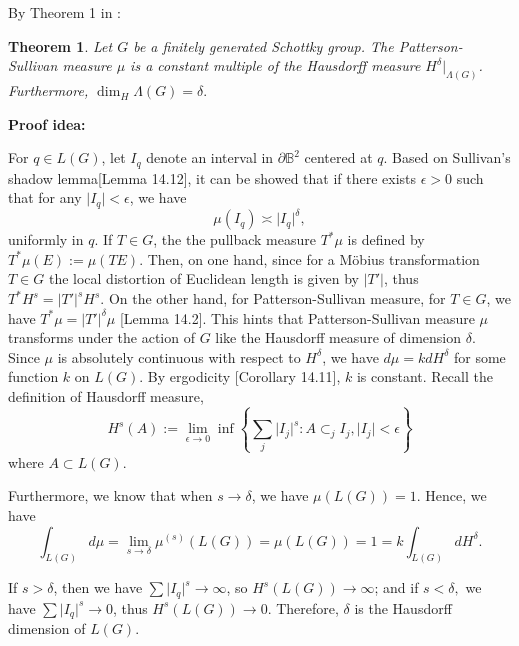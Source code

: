 \documentclass[12pt,oneside]{sfsuthesis}
\theoremstyle{plain} %
\newtheorem{theorem}{Theorem}[chapter]
\theoremstyle{definition}  %
\theoremstyle{remark}  %
\theoremstyle{plain}
\begin{document}
{By Theorem 1 in \cite{sullivan1984entropy}:
\begin{theorem}\label{Theorem14.14inBorthwick}%
Let $G$ be a finitely generated Schottky group. The Patterson-Sullivan measure $\mu$ is a constant multiple of the Hausdorff measure $H^{\delta}\vert_{\Lambda(G)}$. Furthermore, $\dim_H\Lambda(G)=\delta.$
\end{theorem}

\noindent\textbf{Proof idea:}

For $q\in L(G)$, let $I_q$ denote an interval in $\partial \mathbb{B}^2$ centered at $q$. Based on Sullivan's shadow lemma\cite{borthwick2007spectral}[Lemma 14.12], it can be showed that if there exists $\epsilon>0$ such that for any $\vert I_q\vert<\epsilon$, we have 
$$
\mu\left(I_q\right)\asymp \vert I_q\vert^\delta,
$$
uniformly in $q$. If $T\in G$, the the pullback measure $T^\ast \mu$ is defined by $T^\ast \mu(E):=\mu(TE)$. Then, on one hand, since for a M\"{o}bius transformation $T\in G$ the local distortion of Euclidean length is given by $\vert T'\vert$, thus $T^\ast H^s=\vert T' \vert^s H^s$. On the other hand, for Patterson-Sullivan measure, for $T\in G$, we have $T^\ast \mu=\vert T' \vert^\delta \mu$ \cite{borthwick2007spectral}[Lemma 14.2]. This hints that Patterson-Sullivan measure $\mu$ transforms under the action of $G$ like the Hausdorff measure of dimension $\delta$. Since $\mu$ is absolutely continuous with respect to $H^\delta$, we have $d\mu=kdH^\delta$ for some function $k$ on $L(G)$. By ergodicity \cite{borthwick2007spectral}[Corollary 14.11], $k$ is constant.
Recall the definition of Hausdorff measure,
$$
H^s\left(A\right):=\lim\limits_{\epsilon\to 0}\inf\left\lbrace \sum\limits_{j}\vert I_j\vert^s: A\subset_j I_j,\vert I_j\vert<\epsilon \right\rbrace
$$
where $A\subset L(G).$

Furthermore, we know that when $s\to \delta$, we have $\mu(L(G))=1$. Hence, we have
$$
\int_{L(G)} d\mu =\lim\limits_{s\to\delta}\mu^{(s)}(L(G)) = \mu(L(G))=1 = k \int_{L(G)} dH^\delta.
$$


If $s>\delta$, then we have $\sum\vert I_q\vert^s\to \infty$, so $H^s\left(L(G)\right)\to \infty$; and if $s<\delta,$ we have $\sum\vert I_q\vert^s\to 0$, thus $H^s\left(L(G)\right)\to 0$. Therefore, $\delta$ is the Hausdorff dimension of $L(G)$.






}
\end{document}
